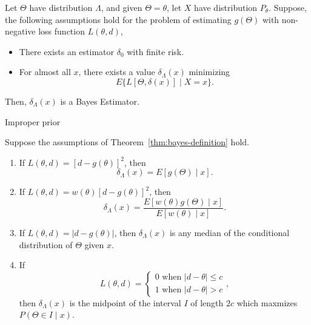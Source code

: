\begin{theorem} \label{thm:bayes-definition}
	Let $\Theta$ have distribution $\Lambda$, and given $\Theta=\theta$, let $X$ have distribution $P_{\theta}$. Suppose, the following assumptions hold for the problem of estimating $g\left(\Theta\right)$ with non-negative loss function $L\left(\theta,d\right)$,
	\begin{itemize}
		\item There exists an estimator $\delta_0$ with finite risk.
		\item For almost all $x$, there exists a value $\delta_{\Lambda}\left(x\right)$ minimizing
		      \begin{equation}
			      E\{L[\Theta,\delta\left(x\right)] \mid X=x\}.
		      \end{equation}
	\end{itemize}
	Then, $\delta_{\Lambda}\left(x\right)$ is a Bayes Estimator.
\end{theorem}
\begin{remark}
	Improper prior
\end{remark}

\begin{corollary}
	Suppose the assumptions of Theorem~\ref{thm:bayes-definition} hold.
	\begin{enumerate}
		\item If $L\left(\theta,d\right)=[d-g\left(\theta\right)]^2$, then
		      \begin{equation}
			      \delta_{\Lambda}\left(x\right)=E[g\left(\Theta\right) \mid x].
		      \end{equation}
		\item If $L\left(\theta,d\right)=w\left(\theta\right)[d-g\left(\theta\right)]^2$, then
		      \begin{equation}
			      \delta_{\Lambda}\left(x\right)=\frac{E[w\left(\theta\right)g\left(\Theta\right) \mid x]}{E[w\left(\theta\right) \mid x]}.
		      \end{equation}
		\item If $L\left(\theta,d\right)=|d-g\left(\theta\right)|$, then $\delta_\Lambda\left(x\right)$ is any median of the conditional distribution of $\Theta$ given $x$.
		\item If
		      \begin{equation*}
			      L(\theta, d)=\left\{
			      \begin{array}{l}
				      0 \text { when }|d-\theta| \leq c \\
				      1 \text { when }|d-\theta|>c
			      \end{array}
			      \right.,
		      \end{equation*}
		      then $\delta_\Lambda\left(x\right)$ is the midpoint of the interval $I$ of length $2c$ which maxmizes $P\left(\Theta\in I\mid x\right)$.
	\end{enumerate}
\end{corollary}

